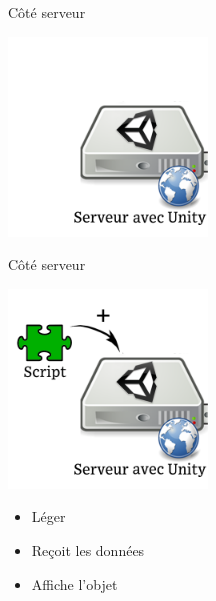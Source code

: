 \documentclass[a4paper,10pt]{beamer}
\begin{document}
	
	\begin{frame}{Côté serveur}
		\centerline{\includegraphics[height=150pt]{images/network/plugin1.png}}
		
	\end{frame}
	\begin{frame}{Côté serveur}
		\centerline{\includegraphics[height=150pt]{images/network/plugin.png}}
		\begin{itemize}	
			\item \pause Léger \pause
			\item Reçoit les données \pause
			\item Affiche l'objet 
		\end{itemize}	
		
	\end{frame}
	
\end{document}
